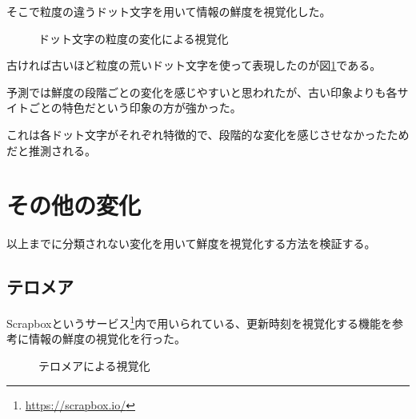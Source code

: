 そこで粒度の違うドット文字を用いて情報の鮮度を視覚化した。

\begin{figure}[htbp]
  \begin{center}
  \end{center}
  \caption{ドット文字の粒度の変化による視覚化}
  \label{fig:ver-dot}
\end{figure}

古ければ古いほど粒度の荒いドット文字を使って表現したのが図\ref{fig:ver-dot}である。

予測では鮮度の段階ごとの変化を感じやすいと思われたが、古い印象よりも各サイトごとの特色だという印象の方が強かった。

これは各ドット文字がそれぞれ特徴的で、段階的な変化を感じさせなかったためだと推測される。

\section{その他の変化}
\label{sec:ver-other}

以上までに分類されない変化を用いて鮮度を視覚化する方法を検証する。

\subsection{テロメア}
\label{subsec:ver-oth-tlm}

Scrapboxというサービス\footnote{\url{https://scrapbox.io/}}内で用いられている、更新時刻を視覚化する機能\cite{telomere}を参考に情報の鮮度の視覚化を行った。

\begin{figure}[htbp]
  \begin{center}
  \end{center}
  \caption{テロメアによる視覚化}
  \label{fig:ver-telomere}
\end{figure}

